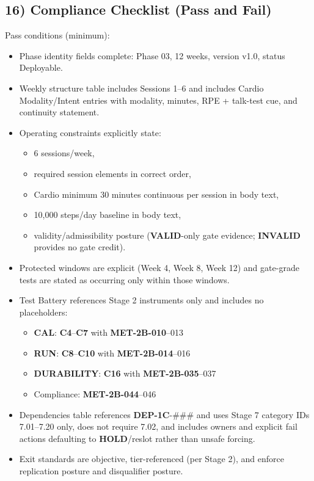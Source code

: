\documentclass[10pt]{article}
\begin{document}
\subsection*{16) Compliance Checklist (Pass and Fail)}

Pass conditions (minimum):

\begin{itemize}
\item Phase identity fields complete: Phase 03, 12 weeks, version v1.0, status Deployable.
\item Weekly structure table includes Sessions 1–6 and includes Cardio Modality/Intent entries with modality, minutes, RPE + talk-test cue, and continuity statement.
\item Operating constraints explicitly state:
  \begin{itemize}
  \item 6 sessions/week,
  \item required session elements in correct order,
  \item Cardio minimum 30 minutes continuous per session in body text,
  \item 10,000 steps/day baseline in body text,
  \item validity/admissibility posture (\textbf{VALID}-only gate evidence; \textbf{INVALID} provides no gate credit).
  \end{itemize}
\item Protected windows are explicit (Week 4, Week 8, Week 12) and gate-grade tests are stated as occurring only within those windows.
\item Test Battery references Stage 2 instruments only and includes no placeholders:
  \begin{itemize}
  \item \textbf{CAL}: \textbf{C4}–\textbf{C7} with \textbf{MET-2B-010}–013
  \item \textbf{RUN}: \textbf{C8}–\textbf{C10} with \textbf{MET-2B-014}–016
  \item \textbf{DURABILITY}: \textbf{C16} with \textbf{MET-2B-035}–037
  \item Compliance: \textbf{MET-2B-044}–046
  \end{itemize}
\item Dependencies table references \textbf{DEP-1C}-\#\#\# and uses Stage 7 category IDs 7.01–7.20 only, does not require 7.02, and includes owners and explicit fail actions defaulting to \textbf{HOLD}/reslot rather than unsafe forcing.
\item Exit standards are objective, tier-referenced (per Stage 2), and enforce replication posture and disqualifier posture.
\end{itemize}
\end{document}
